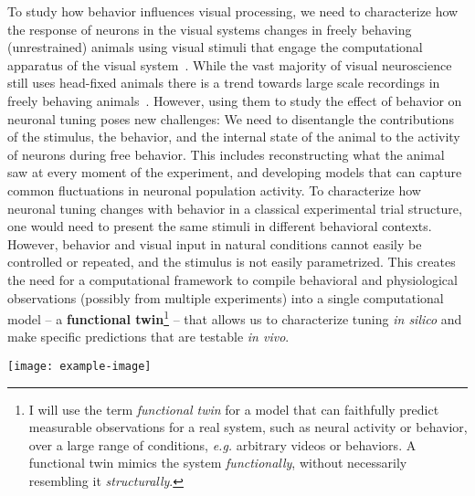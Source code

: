 \documentclass[COG,11pt]{ercgrant}
\begin{document}
To study how behavior influences visual processing, we need to characterize how the response of neurons in the visual systems changes in freely behaving (unrestrained) animals using visual stimuli that engage the computational apparatus of the visual system~\parencite{Huk2018-ez, Datta2019-qj}. 
While the vast majority of visual neuroscience still uses head-fixed animals there is a trend towards large scale recordings in freely behaving animals~\parencite{Parker2022-ac}.
However, using them to study the effect of behavior on neuronal tuning poses new challenges:
 We need to disentangle the contributions of the stimulus, the behavior, and the internal state of the animal to the activity of neurons during free behavior. 
This includes reconstructing what the animal saw at every moment of the experiment, and developing models that can capture common fluctuations in neuronal population activity.
 To characterize how neuronal tuning changes with behavior in a classical experimental trial structure, one would need to present the same stimuli in different behavioral contexts. 
However, behavior and visual input in natural conditions cannot easily be controlled or repeated, and the stimulus is not easily parametrized.
This creates the need for a computational framework to compile behavioral and physiological observations (possibly from multiple experiments) into a single computational model -- a \textbf{functional twin}\footnote{I will use the term \textit{functional twin} for a model that can faithfully predict measurable observations for a real system, such as neural activity or behavior, over a large range of conditions, \textit{e.g.} arbitrary videos or behaviors. A functional twin mimics the system \textit{functionally}, without necessarily resembling it \textit{structurally}. } -- that allows us to characterize tuning \textit{in silico} and make specific predictions that are testable \textit{in vivo}.

\texttt{[image: example-image]}
\end{document}
